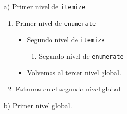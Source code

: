 \documentclass[a4paper,12pt]{article}
\begin{document}
  \begin{itemize}
    \item[a)] Primer nivel de \texttt{itemize}
        \begin{enumerate}
            \item Primer nivel de \texttt{enumerate}
                \begin{itemize}
                    \item Segundo nivel de \texttt{itemize}
                        \begin{enumerate}
                            \item Segundo nivel de \texttt{enumerate}
                        \end{enumerate}
                    \item Volvemos al tercer nivel global.
                \end{itemize}
            \item Estamos en el segundo nivel global.
        \end{enumerate}
    \item[b)] Primer nivel global.
 \end{itemize}


 
\end{document}
